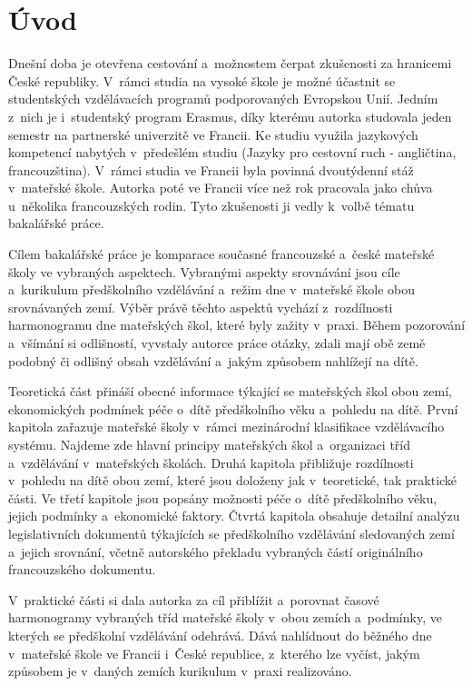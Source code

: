 \chapter*{Úvod}
\vspace{-5mm}
Dnešní doba je otevřena cestování a~možnostem čerpat zkušenosti za hranicemi České republiky. V~rámci studia na vysoké škole je možné účastnit se studentských vzdělávacích programů podporovaných Evropskou Unií. Jedním z~nich je i~studentský program Erasmus, díky kterému autorka studovala jeden semestr na partnerské univerzitě ve Francii. Ke studiu využila jazykových kompetencí nabytých v~předešlém studiu (Jazyky pro cestovní ruch - angličtina, francouzština). V~rámci studia ve Francii byla povinná dvoutýdenní stáž v~mateřské škole. Autorka poté ve Francii více než rok pracovala jako chůva u~několika francouzských rodin. Tyto zkušenosti ji vedly k~volbě tématu bakalářské práce. 

Cílem bakalářské práce je komparace současné francouzské a~české mateřské školy ve vybraných aspektech. Vybranými aspekty srovnávání jsou cíle a~kurikulum předškolního vzdělávání a~režim dne v mateřské škole obou srovnávaných zemí. Výběr právě těchto aspektů vychází z~rozdílnosti harmonogramu dne mateřských škol, které byly zažity v~praxi. Během pozorování a~všímání si odlišností, vyvstaly autorce práce otázky, zdali mají obě země podobný či odlišný obsah vzdělávání a~jakým způsobem nahlížejí na dítě. 


Teoretická část přináší obecné informace týkající se mateřských škol obou zemí, ekonomických podmínek péče o~dítě předškolního věku a~pohledu na dítě. První kapitola zařazuje mateřské školy v~rámci mezinárodní klasifikace vzdělávacího systému. Najdeme zde hlavní principy mateřských škol a~organizaci tříd a~vzdělávání v~mateřských školách. Druhá kapitola přibližuje rozdílnosti v~pohledu na dítě obou zemí, které jsou doloženy jak v~teoretické, tak praktické části. Ve třetí kapitole jsou popsány možnosti péče o~dítě předškolního věku, jejich podmínky a~ekonomické faktory. Čtvrtá kapitola obsahuje detailní analýzu legislativních dokumentů týkajících se předškolního vzdělávání sledovaných zemí a~jejich srovnání, včetně autorského překladu vybraných částí originálního francouzského dokumentu.

V~praktické části si dala autorka za cíl přiblížit a~porovnat časové harmonogramy vybraných tříd mateřské školy v~obou zemích a~podmínky, ve kterých se předškolní vzdělávání odehrává. Dává nahlídnout do běžného dne v~mateřské škole ve Francii i~České republice, z~kterého lze vyčíst, jakým způsobem je v~daných zemích kurikulum v~praxi realizováno.  